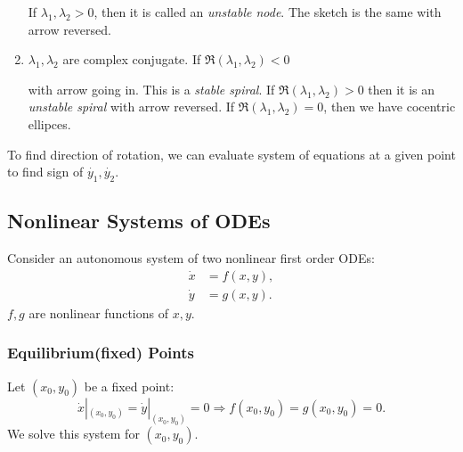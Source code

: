 \documentclass[10pt]{article}
\begin{document}
\begin{enumerate}
\begin{center}
          \end{center}
          If $ \lambda_1,\lambda_2>0 $, then it is called an \textit{unstable node}. The sketch is the same with arrow reversed.
          \item $ \lambda_1,\lambda_2 $ are complex conjugate. If $ \Re(\lambda_1,\lambda_2)<0 $
          \begin{center}
          \end{center}
          with arrow going in. This is a \textit{stable spiral}. If $ \Re(\lambda_1,\lambda_2)>0 $ then it is an \textit{unstable spiral} with arrow reversed. If $ \Re(\lambda_1,\lambda_2)=0 $, then we have cocentric ellipces. 
    \end{enumerate}
    \begin{remark}
        To find direction of rotation, we can evaluate system of equations at a given point to find sign of $ \dot{y_1},\dot{y_2} $.
    \end{remark}
    \subsection{Nonlinear Systems of ODEs}
    Consider an autonomous system of two nonlinear first order ODEs:
    \begin{align*}
        \dot{x}&= f(x,y),\\
        \dot{y}&= g(x,y).
    \end{align*}
    $f,g$ are nonlinear functions of $x,y$.
    \subsubsection*{Equilibrium(fixed) Points}
    Let $ (x_0,y_0) $ be a fixed point:
    \[
        \dot{x}|_{(x_0,y_0)} = \dot{y}|_{(x_0,y_0)}=0 \Rightarrow f(x_0,y_0)=g(x_0,y_0)=0.
    \]
    We solve this system for $(x_0,y_0)$.
\end{document}
